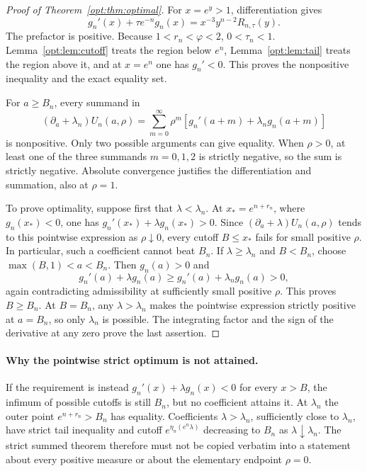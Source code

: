 \begin{proof}[Proof of Theorem~\ref{opt:thm:optimal}]
For $x=e^y>1$, differentiation gives
\begin{equation}\label{opt:eq:pointwise-factor}
 g_n'(x)+\tau e^{-n}g_n(x)
 =x^{-3}y^{n-2}R_{n,\tau}(y).
\end{equation}
The prefactor is positive. Because $1<r_n<\varphi<2$,
$0<\tau_n<1$. Lemma~\ref{opt:lem:cutoff} treats the region below
$e^n$, Lemma~\ref{opt:lem:tail} treats the region above it, and
at $x=e^n$ one has $g_n'<0$. This proves the nonpositive inequality
and the exact equality set.

For $a\geq B_n$, every summand in
\[
 (\partial_a+\lambda_n)U_n(a,\rho)
 =\sum_{m=0}^{\infty}\rho^m
       [g_n'(a+m)+\lambda_n g_n(a+m)]
\]
is nonpositive. Only two possible arguments can give equality.
When $\rho>0$, at least one of the three summands $m=0,1,2$ is
strictly negative, so the sum is strictly negative. Absolute convergence
justifies the differentiation and summation, also at $\rho=1$.

To prove optimality, suppose first that $\lambda<\lambda_n$.
At $x_*=e^{n+r_n}$, where $g_n(x_*)<0$, one has
$g_n'(x_*)+\lambda g_n(x_*)>0$. Since
$(\partial_a+\lambda)U_n(a,\rho)$ tends to this pointwise expression
as $\rho\downarrow0$, every cutoff $B\leq x_*$ fails for small
positive $\rho$. In particular, such a coefficient cannot beat $B_n$.
If $\lambda\geq\lambda_n$ and $B<B_n$, choose
$\max(B,1)<a<B_n$. Then $g_n(a)>0$ and
\[
 g_n'(a)+\lambda g_n(a)
 \geq g_n'(a)+\lambda_n g_n(a)>0,
\]
again contradicting admissibility at sufficiently small positive $\rho$.
This proves $B\geq B_n$. At $B=B_n$, any $\lambda>\lambda_n$
makes the pointwise expression strictly positive at $a=B_n$,
so only $\lambda_n$ is possible. The integrating factor and the sign
of the derivative at any zero prove the last assertion.
\end{proof}

\paragraph{Why the pointwise strict optimum is not attained.}
If the requirement is instead
$g_n'(x)+\lambda g_n(x)<0$ for every $x>B$, the infimum of possible
cutoffs is still $B_n$, but no coefficient attains it. At
$\lambda_n$ the outer point $e^{n+r_n}>B_n$ has equality.
Coefficients $\lambda>\lambda_n$, sufficiently close to $\lambda_n$,
have strict tail inequality and cutoff $e^{\eta_n(e^n\lambda)}$
decreasing to $B_n$ as $\lambda\downarrow\lambda_n$.
The strict summed theorem therefore must not be copied verbatim into
a statement about every positive measure or about the elementary
endpoint $\rho=0$.

